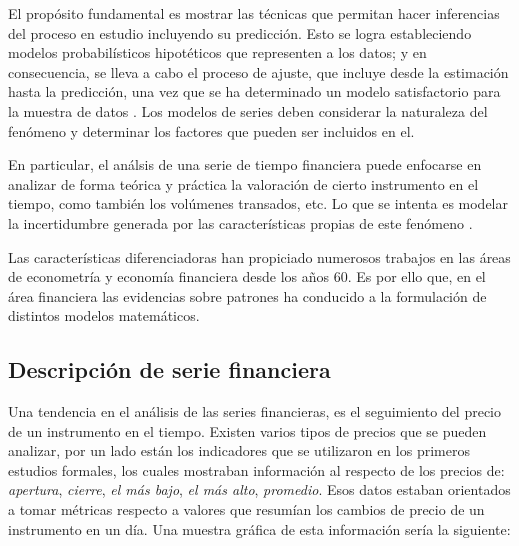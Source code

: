 El propósito fundamental es mostrar las técnicas que permitan hacer inferencias
del proceso en estudio incluyendo su predicción. Esto se logra estableciendo
modelos probabilísticos hipotéticos que representen a los datos; y en
consecuencia, se lleva a cabo el proceso de ajuste, que incluye desde la
estimación hasta la predicción, una vez que se ha determinado un modelo
satisfactorio para la muestra de datos \cite{box2011time}
\cite{vandaele1983applied}. Los modelos de series deben considerar la
naturaleza del fenómeno y determinar los factores que pueden ser incluidos en
el.

En particular, el análsis de una serie de tiempo financiera puede enfocarse en
analizar de forma teórica y práctica la valoración de cierto instrumento en el
tiempo, como también los volúmenes transados, etc. Lo que se intenta es modelar
la incertidumbre generada por las características propias de este fenómeno
\cite{tsay2005analysis}. 

Las características diferenciadoras han propiciado numerosos trabajos en las
áreas de econometría y economía financiera desde los años 60. Es por ello que,
en el área financiera las evidencias sobre patrones ha conducido a la
formulación de distintos modelos matemáticos.

\subsection{Descripción de serie financiera}

Una tendencia en el análisis de las series financieras, es el seguimiento del
precio de un instrumento en el tiempo.
Existen varios tipos de precios que se pueden analizar, por un lado están los
indicadores que se utilizaron en los primeros estudios formales, los cuales
mostraban información al respecto de los precios de: \emph{apertura},
\emph{cierre}, \emph{el más bajo}, \emph{el más alto}, \emph{promedio}. Esos
datos estaban orientados a tomar métricas respecto a valores que resumían los
cambios de precio de un instrumento en un día. Una muestra gráfica de esta
información sería la siguiente:

